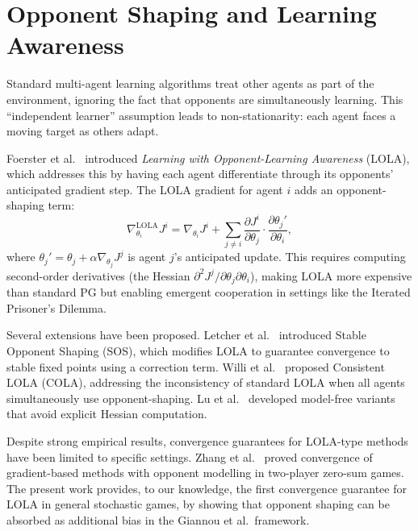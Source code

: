 \section{Opponent Shaping and Learning Awareness}
\label{sec:lit-opponent}

Standard multi-agent learning algorithms treat other agents as part of the environment, ignoring the fact that opponents are simultaneously learning. This ``independent learner'' assumption leads to non-stationarity: each agent faces a moving target as others adapt.

Foerster et al.~\cite{foerster2018lola} introduced \emph{Learning with Opponent-Learning Awareness} (LOLA), which addresses this by having each agent differentiate through its opponents' anticipated gradient step. The LOLA gradient for agent $i$ adds an opponent-shaping term:
\begin{equation*}
    \nabla_{\theta_i}^{\text{LOLA}} J^i = \nabla_{\theta_i} J^i + \sum_{j \neq i} \frac{\partial J^i}{\partial \theta_j} \cdot \frac{\partial \theta_j'}{\partial \theta_i},
\end{equation*}
where $\theta_j' = \theta_j + \alpha \nabla_{\theta_j} J^j$ is agent $j$'s anticipated update. This requires computing second-order derivatives (the Hessian $\partial^2 J^j / \partial \theta_j \partial \theta_i$), making LOLA more expensive than standard PG but enabling emergent cooperation in settings like the Iterated Prisoner's Dilemma.

Several extensions have been proposed. Letcher et al.~\cite{letcher2019} introduced Stable Opponent Shaping (SOS), which modifies LOLA to guarantee convergence to stable fixed points using a correction term. Willi et al.~\cite{willi2022cola} proposed Consistent LOLA (COLA), addressing the inconsistency of standard LOLA when all agents simultaneously use opponent-shaping. Lu et al.~\cite{lu2022model} developed model-free variants that avoid explicit Hessian computation.

Despite strong empirical results, convergence guarantees for LOLA-type methods have been limited to specific settings. Zhang et al.~\cite{zhang2010} proved convergence of gradient-based methods with opponent modelling in two-player zero-sum games. The present work provides, to our knowledge, the first convergence guarantee for LOLA in general stochastic games, by showing that opponent shaping can be absorbed as additional bias in the Giannou et al.\ framework.


